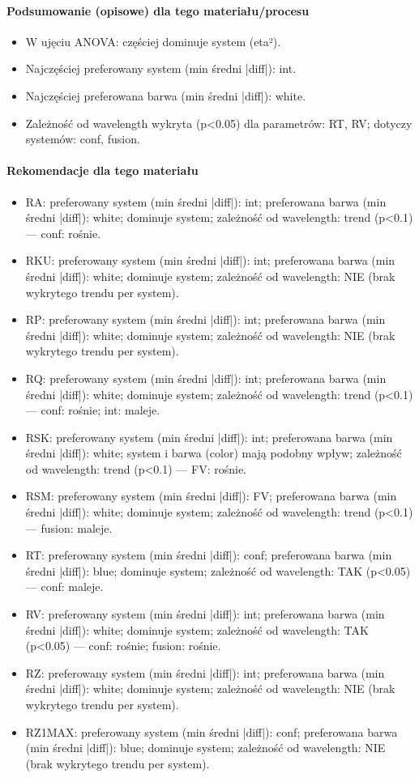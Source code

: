 \documentclass[
  10pt,
]{article}
\begin{document}
\paragraph{Podsumowanie (opisowe) dla tego materiału/procesu}
\begin{itemize}
\item W ujęciu ANOVA: częściej dominuje system (eta²).
\item Najczęściej preferowany system (min średni |diff|): int.
\item Najczęściej preferowana barwa (min średni |diff|): white.
\item Zależność od wavelength wykryta (p<0.05) dla parametrów: RT, RV; dotyczy systemów: conf, fusion.
\end{itemize}
\paragraph{Rekomendacje dla tego materiału}
\begin{itemize}
\item RA: preferowany system (min średni |diff|): int; preferowana barwa (min średni |diff|): white; dominuje system; zależność od wavelength: trend (p<0.1) — conf: rośnie.
\item RKU: preferowany system (min średni |diff|): int; preferowana barwa (min średni |diff|): white; dominuje system; zależność od wavelength: NIE (brak wykrytego trendu per system).
\item RP: preferowany system (min średni |diff|): int; preferowana barwa (min średni |diff|): white; dominuje system; zależność od wavelength: NIE (brak wykrytego trendu per system).
\item RQ: preferowany system (min średni |diff|): int; preferowana barwa (min średni |diff|): white; dominuje system; zależność od wavelength: trend (p<0.1) — conf: rośnie; int: maleje.
\item RSK: preferowany system (min średni |diff|): int; preferowana barwa (min średni |diff|): white; system i barwa (color) mają podobny wpływ; zależność od wavelength: trend (p<0.1) — FV: rośnie.
\item RSM: preferowany system (min średni |diff|): FV; preferowana barwa (min średni |diff|): white; dominuje system; zależność od wavelength: trend (p<0.1) — fusion: maleje.
\item RT: preferowany system (min średni |diff|): conf; preferowana barwa (min średni |diff|): blue; dominuje system; zależność od wavelength: TAK (p<0.05) — conf: maleje.
\item RV: preferowany system (min średni |diff|): int; preferowana barwa (min średni |diff|): white; dominuje system; zależność od wavelength: TAK (p<0.05) — conf: rośnie; fusion: rośnie.
\item RZ: preferowany system (min średni |diff|): int; preferowana barwa (min średni |diff|): white; dominuje system; zależność od wavelength: NIE (brak wykrytego trendu per system).
\item RZ1MAX: preferowany system (min średni |diff|): conf; preferowana barwa (min średni |diff|): blue; dominuje system; zależność od wavelength: NIE (brak wykrytego trendu per system).
\end{itemize}
\end{document}
